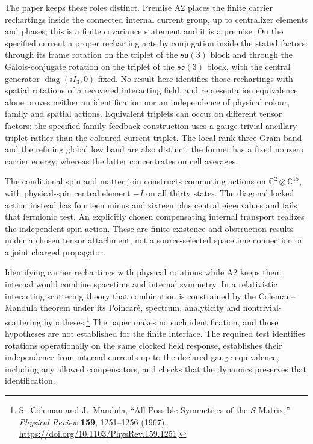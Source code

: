 \documentclass[11pt]{article}
\begin{document}
The paper keeps these roles distinct. Premise A2 places the finite carrier
rechartings inside the connected internal current group, up to centralizer
elements and phases; this is a finite covariance statement and it is a
premise. On the specified current a proper recharting acts by conjugation inside
the stated factors: through its frame rotation on the triplet of the
\(\mathfrak{su}(3)\) block and through the Galois-conjugate rotation on the
triplet of the \(\mathfrak{so}(3)\) block, with the central generator
\(\operatorname{diag}(iI_3,0)\) fixed. No result here identifies those
rechartings with spatial rotations of a recovered interacting field, and
representation equivalence alone proves neither an identification nor an
independence of physical colour, family and spatial actions. Equivalent
triplets can occur on different tensor factors: the specified family-feedback
construction uses a gauge-trivial ancillary triplet rather than the coloured
current triplet. The local rank-three Gram band and the refining global low
band are also distinct: the former has a fixed nonzero carrier energy,
whereas the latter concentrates on cell averages.

The conditional spin and matter join constructs commuting actions on
\(\mathbb C^2\otimes\mathbb C^{15}\), with physical-spin central element
\(-I\) on all thirty states. The diagonal locked action instead has fourteen
minus and sixteen plus central eigenvalues and fails that fermionic test. An
explicitly chosen compensating internal transport realizes the independent
spin action. These are finite existence and obstruction results under a
chosen tensor attachment, not a source-selected spacetime connection or a
joint charged propagator.

Identifying carrier rechartings with physical rotations while A2 keeps them
internal would combine spacetime and internal symmetry. In a relativistic
interacting scattering theory that combination is constrained by the
Coleman--Mandula theorem under its Poincar\'e, spectrum, analyticity and
nontrivial-scattering hypotheses.\footnote{S.~Coleman and J.~Mandula,
``All Possible Symmetries of the \(S\) Matrix,'' \emph{Physical Review}
\textbf{159}, 1251--1256 (1967),
\url{https://doi.org/10.1103/PhysRev.159.1251}.} The paper makes no such
identification, and those hypotheses are not established for the finite
interface. The required test identifies rotations operationally on the same
clocked field response, establishes their independence from internal
currents up to the declared gauge equivalence, including any allowed
compensators, and checks that the dynamics preserves that identification.
\end{document}
